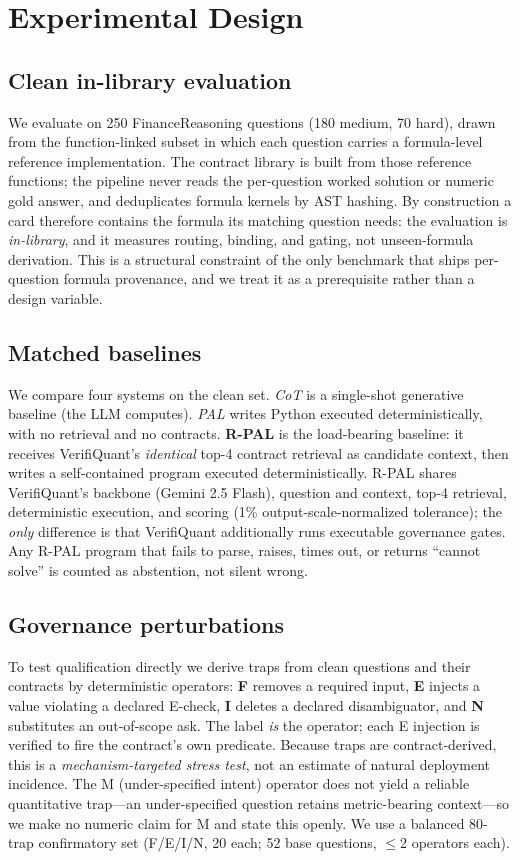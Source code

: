 \section{Experimental Design}\label{sec:v2design}
\subsection{Clean in-library evaluation}
We evaluate on 250 FinanceReasoning \cite{tang2025financereasoning} questions (180 medium, 70 hard), drawn from the function-linked subset in which each question carries a formula-level reference implementation.
The contract library is built from those reference functions; the pipeline never reads the per-question worked solution or numeric gold answer, and deduplicates formula kernels by AST hashing.
By construction a card therefore contains the formula its matching question needs: the evaluation is \emph{in-library}, and it measures routing, binding, and gating, not unseen-formula derivation.
This is a structural constraint of the only benchmark that ships per-question formula provenance, and we treat it as a prerequisite rather than a design variable.

\subsection{Matched baselines}
We compare four systems on the clean set.
\emph{CoT} is a single-shot generative baseline (the LLM computes).
\emph{PAL} writes Python executed deterministically, with no retrieval and no contracts.
\textbf{R-PAL} is the load-bearing baseline: it receives VerifiQuant's \emph{identical} top-4 contract retrieval as candidate context, then writes a self-contained program executed deterministically.
R-PAL shares VerifiQuant's backbone (Gemini 2.5 Flash), question and context, top-4 retrieval, deterministic execution, and scoring (1\% output-scale-normalized tolerance); the \emph{only} difference is that VerifiQuant additionally runs executable governance gates.
Any R-PAL program that fails to parse, raises, times out, or returns ``cannot solve'' is counted as abstention, not silent wrong.

\subsection{Governance perturbations}
To test qualification directly we derive traps from clean questions and their contracts by deterministic operators: \textbf{F} removes a required input, \textbf{E} injects a value violating a declared E-check, \textbf{I} deletes a declared disambiguator, and \textbf{N} substitutes an out-of-scope ask.
The label \emph{is} the operator; each E injection is verified to fire the contract's own predicate.
Because traps are contract-derived, this is a \emph{mechanism-targeted stress test}, not an estimate of natural deployment incidence.
The M (under-specified intent) operator does not yield a reliable quantitative trap---an under-specified question retains metric-bearing context---so we make no numeric claim for M and state this openly.
We use a balanced 80-trap confirmatory set (F/E/I/N, 20 each; 52 base questions, $\le$2 operators each).

